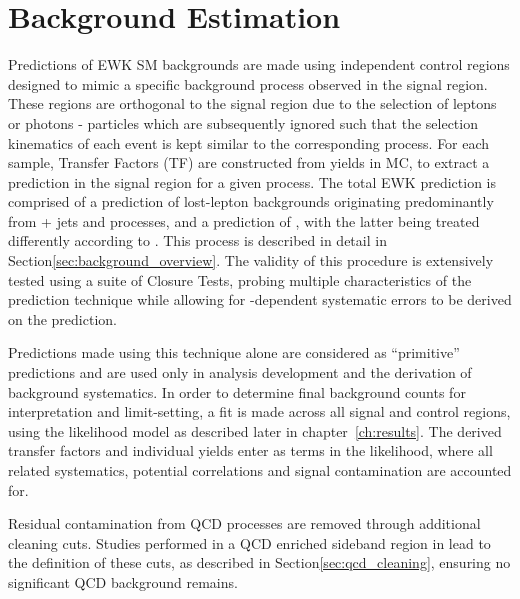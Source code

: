 \chapter{Background Estimation}
\label{ch:background}

\ifpdf
    \graphicspath{{Chapter6/Figs/Raster/}{Chapter6/Figs/PDF/}{Chapter6/Figs/}}
\else
    \graphicspath{{Chapter6/Figs/Vector/}{Chapter6/Figs/}}
\fi

Predictions of EWK SM backgrounds are made using independent control regions
designed to mimic a specific background process observed in the signal region.
These regions are orthogonal to the signal region due to the
selection of leptons or photons - particles which are subsequently ignored such 
that the selection kinematics of each event is kept similar to the corresponding
process. For each sample, Transfer Factors (TF) are 
constructed from yields in MC, to extract a prediction in the signal 
region for a given process. The total EWK prediction is comprised of a prediction
of lost-lepton backgrounds originating predominantly from \ttbar + jets and \wj processes,
and a prediction of \zj, with the latter being treated differently according to \nb.
This process is described in detail in
Section\ref{sec:background_overview}. The validity of this procedure is
extensively tested using a suite of Closure Tests, probing multiple
characteristics of the prediction technique while allowing for \HT-dependent
systematic errors to be derived on the prediction.

Predictions made using this technique alone are considered as ``primitive'' 
predictions and are used only in analysis development and the derivation of 
background systematics. In order to determine final background counts for
interpretation and
limit-setting, a fit is made across all signal and control regions, using the 
likelihood model as described later in chapter~\ref{ch:results}. The derived 
transfer factors and individual yields enter as terms in the likelihood, where 
all related systematics, potential correlations and signal contamination are
accounted for.

Residual contamination from QCD processes are removed through additional
cleaning cuts. Studies performed in a QCD enriched sideband region in \alphat
lead to the definition of these cuts, as described in
Section\ref{sec:qcd_cleaning}, ensuring no significant QCD background remains.


